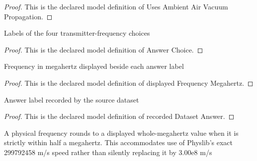 \begin{proof}
  This is the declared model definition of Uses Ambient Air Vacuum Propagation.
\end{proof}
\begin{definition}
  \label{def:physics:phyx-mini-0247:phyxminiproblems-problemphyxmini0247-answerchoice}
  Labels of the four transmitter-frequency choices
\end{definition}
\begin{proof}
  This is the declared model definition of Answer Choice.
\end{proof}
\begin{definition}
  \label{def:physics:phyx-mini-0247:phyxminiproblems-problemphyxmini0247-displayedfrequencymegahertz}
  Frequency in megahertz displayed beside each answer label
\end{definition}
\begin{proof}
  This is the declared model definition of displayed Frequency Megahertz.
\end{proof}
\begin{definition}
  \label{def:physics:phyx-mini-0247:phyxminiproblems-problemphyxmini0247-recordeddatasetanswer}
  Answer label recorded by the source dataset
\end{definition}
\begin{proof}
  This is the declared model definition of recorded Dataset Answer.
\end{proof}
\begin{definition}
  \label{def:physics:phyx-mini-0247:phyxminiproblems-problemphyxmini0247-roundstonearestmegahertz}
  A physical frequency rounds to a displayed whole-megahertz value when it is strictly within half a megahertz. This accommodates use of Physlib's exact 299792458 m/s speed rather than silently replacing it by 3.00e8 m/s
\end{definition}
